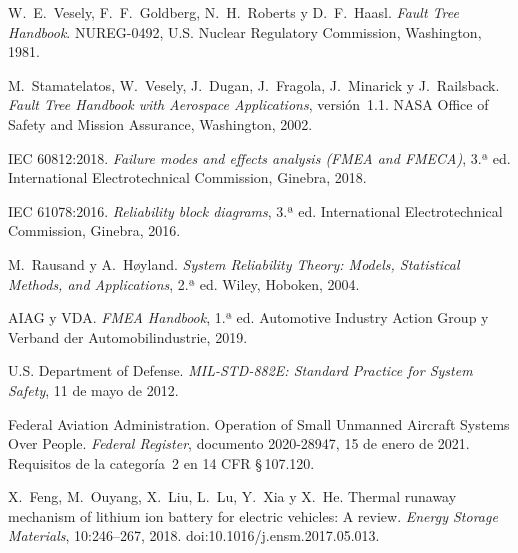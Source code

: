  W.~E.~Vesely, F.~F.~Goldberg, N.~H.~Roberts y
  D.~F.~Haasl. \emph{Fault Tree Handbook}. NUREG-0492, U.S. Nuclear Regulatory
  Commission, Washington, 1981.

 M.~Stamatelatos, W.~Vesely, J.~Dugan,
  J.~Fragola, J.~Minarick y J.~Railsback. \emph{Fault Tree Handbook with Aerospace
  Applications}, versión~1.1. NASA Office of Safety and Mission Assurance, Washington,
  2002.

 IEC 60812:2018. \emph{Failure modes and effects
  analysis (FMEA and FMECA)}, 3.ª ed. International Electrotechnical Commission, Ginebra,
  2018.

 IEC 61078:2016. \emph{Reliability block diagrams},
  3.ª ed. International Electrotechnical Commission, Ginebra, 2016.

 M.~Rausand y A.~Høyland. \emph{System Reliability
  Theory: Models, Statistical Methods, and Applications}, 2.ª ed. Wiley, Hoboken, 2004.

 AIAG y VDA. \emph{FMEA Handbook}, 1.ª ed. Automotive
  Industry Action Group y Verband der Automobilindustrie, 2019.

 U.S. Department of Defense. \emph{MIL-STD-882E:
  Standard Practice for System Safety}, 11 de mayo de 2012.

 Federal Aviation Administration. Operation of Small
  Unmanned Aircraft Systems Over People. \emph{Federal Register}, documento 2020-28947,
  15 de enero de 2021. Requisitos de la categoría~2 en 14 CFR \S\,107.120.

 X.~Feng, M.~Ouyang, X.~Liu, L.~Lu, Y.~Xia y X.~He.
  Thermal runaway mechanism of lithium ion battery for electric vehicles: A review.
  \emph{Energy Storage Materials}, 10:246--267, 2018. doi:10.1016/j.ensm.2017.05.013.
